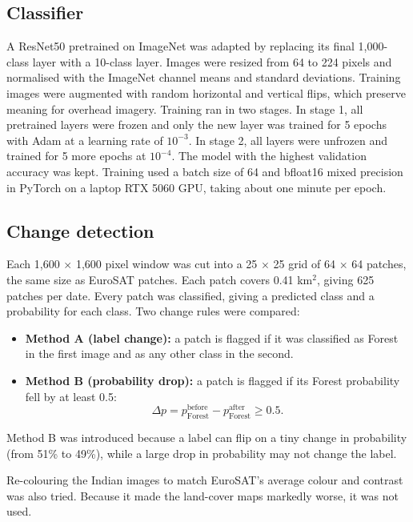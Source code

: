 \documentclass[11pt]{article}
\begin{document}
\subsection{Classifier}
A ResNet50 \citep{he2016} pretrained on ImageNet \citep{deng2009} was adapted by replacing its final 1,000-class layer with a 10-class layer. Images were resized from 64 to 224 pixels and normalised with the ImageNet channel means and standard deviations. Training images were augmented with random horizontal and vertical flips, which preserve meaning for overhead imagery. Training ran in two stages. In stage 1, all pretrained layers were frozen and only the new layer was trained for 5 epochs with Adam \citep{kingma2015} at a learning rate of $10^{-3}$. In stage 2, all layers were unfrozen and trained for 5 more epochs at $10^{-4}$. The model with the highest validation accuracy was kept. Training used a batch size of 64 and bfloat16 mixed precision in PyTorch \citep{paszke2019} on a laptop RTX 5060 GPU, taking about one minute per epoch.

\subsection{Change detection}
Each 1,600 $\times$ 1,600 pixel window was cut into a 25 $\times$ 25 grid of 64 $\times$ 64 patches, the same size as EuroSAT patches. Each patch covers 0.41 km$^2$, giving 625 patches per date. Every patch was classified, giving a predicted class and a probability for each class. Two change rules were compared:
\begin{itemize}
    \item \textbf{Method A (label change):} a patch is flagged if it was classified as Forest in the first image and as any other class in the second.
    \item \textbf{Method B (probability drop):} a patch is flagged if its Forest probability fell by at least 0.5:
    \begin{equation}
    \Delta p = p_{\text{Forest}}^{\text{before}} - p_{\text{Forest}}^{\text{after}} \geq 0.5 .
    \end{equation}
\end{itemize}
Method B was introduced because a label can flip on a tiny change in probability (from 51\% to 49\%), while a large drop in probability may not change the label.

Re-colouring the Indian images to match EuroSAT's average colour and contrast was also tried. Because it made the land-cover maps markedly worse, it was not used.
\end{document}
